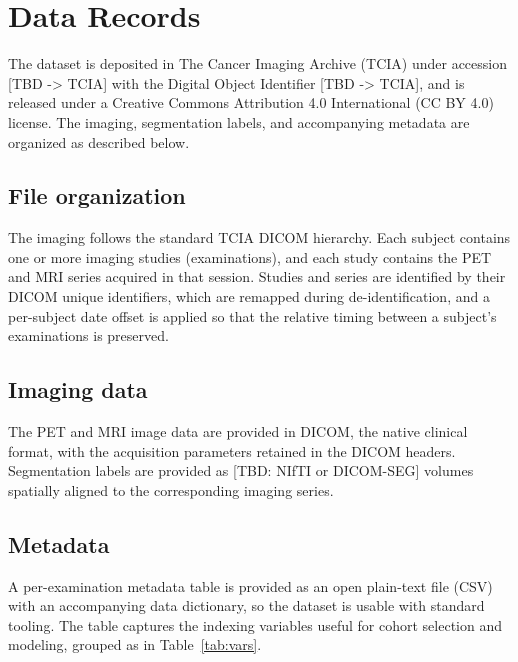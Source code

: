 
\section*{Data Records}\label{sec:datarecords}

The dataset is deposited in The Cancer Imaging Archive (TCIA) under accession [TBD -> TCIA] with the Digital Object Identifier [TBD -> TCIA], and is released under a Creative Commons Attribution 4.0 International (CC BY 4.0) license.
The imaging, segmentation labels, and accompanying metadata are organized as described below.

\subsection*{File organization}\label{subsec:layout}
The imaging follows the standard TCIA DICOM hierarchy.
Each subject contains one or more imaging studies (examinations), and each study contains the PET and MRI series acquired in that session.
Studies and series are identified by their DICOM unique identifiers, which are remapped during de-identification, and a per-subject date offset is applied so that the relative timing between a subject's examinations is preserved.

\subsection*{Imaging data}\label{subsec:imaging}
The PET and MRI image data are provided in DICOM, the native clinical format, with the acquisition parameters retained in the DICOM headers.
Segmentation labels are provided as [TBD: NIfTI or DICOM-SEG] volumes spatially aligned to the corresponding imaging series.

\subsection*{Metadata}\label{subsec:metadata}
A per-examination metadata table is provided as an open plain-text file (CSV) with an accompanying data dictionary, so the dataset is usable with standard tooling.
The table captures the indexing variables useful for cohort selection and modeling, grouped as in Table~\ref{tab:vars}.


